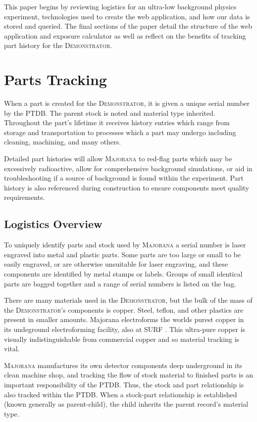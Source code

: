 \documentclass[journal]{IEEEtran}
\begin{document}
This paper begins by reviewing logistics for an ultra-low background
physics experiment, technologies used to create the web application, and
how our data is stored and queried. The final sections of the paper detail
the structure of the web application and exposure calculator as well as reflect
on the benefits of tracking part history for the \textsc{Demonstrator}.

\section{Parts Tracking}
When a part is created for the \textsc{Demonstrator}, it is given a unique serial number by the PTDB. The parent stock
is noted and material type inherited. Throughout the part's lifetime it receives history entries which range from storage
and transportation to processes which a part may undergo including cleaning, machining, and many others.

Detailed part histories will allow \textsc{Majorana}
to red-flag parts which may be excessively radioactive, allow for comprehensive background simulations,
or aid in troubleshooting if a source of background is found within the experiment.
Part history is also referenced during construction to ensure components meet quality requirements.

\subsection{Logistics Overview}

To uniquely identify parts and stock used by \textsc{Majorana} a serial number is laser engraved into metal and plastic parts.
Some parts are too large or small to be easily engraved, or are otherwise unsuitable for laser engraving, and these
components are identified by metal stamps or labels. Groups of small identical parts are bagged together
and a range of serial numbers is listed on the bag.

There are many materials used in the \textsc{Demonstrator}, but the bulk of the mass of the \textsc{Demonstrator}'s components is copper.
Steel, teflon, and other plastics are 
present in smaller amounts. Majorana electroforms the worlds purest copper in its undeground electroforming facility, also at SURF \cite{mj_wilkerson}.
This ultra-pure copper is visually indistinguishable from commercial copper and so material
tracking is vital.


\textsc{Majorana} manufactures its own detector components deep underground in its clean machine shop, and tracking the 
flow of stock material to finished parts is an important responsibility of the PTDB.
Thus, the stock and part relationship is also tracked
within the PTDB.  When a stock-part relationship is established (known generally as parent-child),
the child inherits the parent record's material type. 
\end{document}
